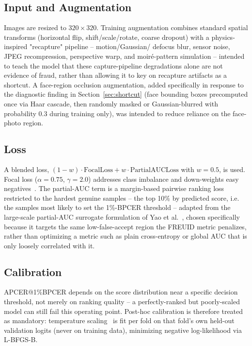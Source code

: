 \documentclass{article}
\begin{document}
\subsection{Input and Augmentation}

Images are resized to $320 \times 320$. Training augmentation combines
standard spatial transforms (horizontal flip, shift/scale/rotate, coarse
dropout) with a physics-inspired "recapture" pipeline -- motion/Gaussian/
defocus blur, sensor noise, JPEG recompression, perspective warp, and
moir\'e-pattern simulation -- intended to teach the model that these
capture-pipeline degradations alone are not evidence of fraud, rather than
allowing it to key on recapture artifacts as a shortcut. A face-region
occlusion augmentation, added specifically in response to the diagnostic
finding in Section~\ref{sec:shortcut} (face bounding boxes precomputed once
via Haar cascade, then randomly masked or Gaussian-blurred with probability
0.3 during training only), was intended to reduce reliance on the
face-photo region.

\subsection{Loss}
\label{sec:loss}

A blended loss, $(1-w)\cdot\text{FocalLoss} + w\cdot\text{PartialAUCLoss}$
with $w=0.5$, is used. Focal loss ($\alpha{=}0.75$, $\gamma{=}2.0$)
addresses class imbalance and down-weights easy negatives~\cite{lin2017focal}.
The partial-AUC term is a margin-based pairwise ranking loss restricted to
the hardest genuine samples -- the top 10\% by predicted score, i.e. the
samples most likely to set the 1\%-BPCER threshold -- adapted from the
large-scale partial-AUC surrogate formulation of Yao et
al.~\cite{yao2022pauc}, chosen specifically because it targets the same
low-false-accept region the FREUID metric penalizes, rather than optimizing
a metric such as plain cross-entropy or global AUC that is only loosely
correlated with it.

\subsection{Calibration}
\label{sec:calibration}

APCER@1\%BPCER depends on the score distribution near a specific decision
threshold, not merely on ranking quality -- a perfectly-ranked but
poorly-scaled model can still fail this operating point. Post-hoc
calibration is therefore treated as mandatory: temperature
scaling~\cite{guo2017calibration} is fit per fold on that fold's own
held-out validation logits (never on training data), minimizing negative
log-likelihood via L-BFGS-B.
\end{document}
